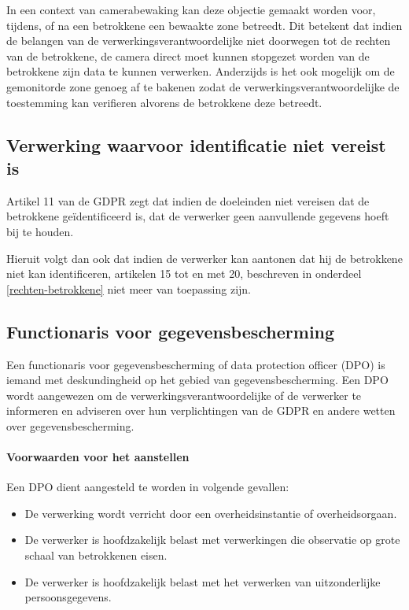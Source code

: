 In een context van camerabewaking kan deze objectie gemaakt worden voor, tijdens, of na een betrokkene een bewaakte zone betreedt. Dit betekent dat indien de belangen van de verwerkingsverantwoordelijke niet doorwegen tot de rechten van de betrokkene, de camera direct moet kunnen stopgezet worden van de betrokkene zijn data te kunnen verwerken. Anderzijds is het ook mogelijk om de gemonitorde zone genoeg af te bakenen zodat de verwerkingsverantwoordelijke de toestemming kan verifieren alvorens de betrokkene deze betreedt. \autocite{edpb2019guidelines}


\subsection{Verwerking waarvoor identificatie niet vereist is}
Artikel 11 van de GDPR zegt dat indien de doeleinden niet vereisen dat de betrokkene geïdentificeerd is, dat de verwerker geen aanvullende gegevens hoeft bij te houden.
\par
Hieruit volgt dan ook dat indien de verwerker kan aantonen dat hij de betrokkene niet kan identificeren, artikelen 15 tot en met 20, beschreven in onderdeel \ref{rechten-betrokkene} niet meer van toepassing zijn.

\subsection{Functionaris voor gegevensbescherming}
Een functionaris voor gegevensbescherming of data protection officer (DPO) is iemand met deskundingheid op het gebied van gegevensbescherming. Een DPO wordt aangewezen om de verwerkingsverantwoordelijke of de verwerker te informeren en adviseren over hun verplichtingen van de GDPR en andere wetten over gegevensbescherming.

\paragraph{Voorwaarden voor het aanstellen}
Een DPO dient aangesteld te worden in volgende gevallen:
\begin{itemize}
	\item De verwerking wordt verricht door een overheidsinstantie of overheidsorgaan.
	\item De verwerker is hoofdzakelijk belast met verwerkingen die observatie op grote schaal van betrokkenen eisen.
	\item De verwerker is hoofdzakelijk belast met het verwerken van uitzonderlijke persoonsgegevens.
\end{itemize}

